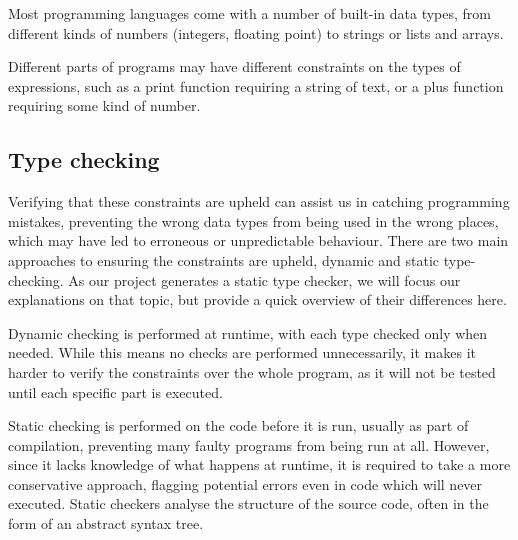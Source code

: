 \documentclass[nofilelist]{cslthse-msc}
\newcommand{\CR}[1]{\textcolor{green!60!black}{[\textbf{CR}:#1]}}
\begin{document}
Most programming languages come with a number of built-in data types, from different kinds of numbers (integers, floating point) to strings or lists and arrays.

Different parts of programs may have different constraints on the types of expressions, such as a print function requiring a string of text, or a plus function requiring some kind of number.

\subsection{Type checking}
Verifying that these constraints are upheld can assist us in catching programming mistakes, preventing the wrong data types from being used in the wrong places, which may have led to erroneous or unpredictable behaviour.
There are two main approaches to ensuring the constraints are upheld, dynamic and static type-checking.
As our project generates a static type checker, we will focus our explanations on that topic, but provide a quick overview of their differences here.

Dynamic checking is performed at runtime, with each type checked only when needed.
While this means no checks are performed unnecessarily, it makes it harder to verify the constraints over the whole program, as it will not be tested until each specific part is executed.

Static checking is performed on the code before it is run, usually as part of compilation, preventing many faulty programs from being run at all.
However, since it lacks knowledge of what happens at runtime, it is required to take a more conservative approach, flagging potential errors even in code which will never executed.
Static checkers analyse the structure of the source code, often in the form of an abstract syntax tree.

\end{document}
